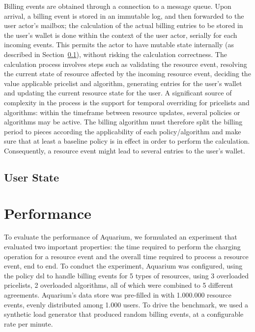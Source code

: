 \documentclass[preprint,10pt]{sigplanconf}
\begin{document}
Billing events are obtained through a connection to a message queue. Upon
arrival, a billing event is stored in an immutable log, and then forwarded to
the user actor's mailbox; the calculation of the actual billing entries to be
stored in the user's wallet is done within the context of the user actor,
serially for each incoming events. This permits the actor to have mutable state
internally (as described in Section~\ref{sec:ustate}), without risking the
calculation correctness. The calculation process involves steps such as
validating the resource event, resolving the current state of resource affected
by the incoming resource event, deciding the value applicable pricelist and
algorithm, generating entries for the user's wallet and updating the current
resource state for the user. A significant source of complexity in the process
is the support for temporal overriding for pricelists and algorithms: within
the timeframe between resource updates, several policies or algorithms may be
active. The billing algorithm must therefore split the billing period to pieces
according the applicability of each policy/algorithm and make sure that at 
least a baseline policy is in effect in order to perform the calculation.
Consequently, a resource event might lead to several entries to the user's wallet.

\subsection{User State}
\label{sec:ustate}

\section{Performance}

To evaluate the performance of Aquarium, we formulated an experiment that
evaluated two important properties: the time required to perform the charging
operation for a resource event and the overall time required to process a
resource event, end to end. To conduct the experiment, Aquarium was configured,
using the policy {\sc dsl} to handle billing events for 5 types of resources,
using 3 overloaded pricelists, 2 overloaded algorithms, all of which were
combined to 5 different agreements. Aquarium's data store was pre-filled in
with 1.000.000 resource events, evenly distributed among 1.000 users. To drive
the benchmark, we used a synthetic load generator that produced random
billing events, at a configurable rate per minute. 
\end{document}
